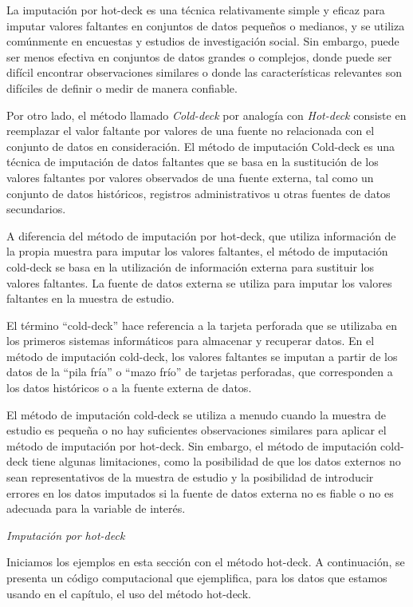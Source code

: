 \documentclass[
  12pt,
]{book}
\begin{document}
La imputación por hot-deck es una técnica relativamente simple y eficaz para imputar valores faltantes en conjuntos de datos pequeños o medianos, y se utiliza comúnmente en encuestas y estudios de investigación social. Sin embargo, puede ser menos efectiva en conjuntos de datos grandes o complejos, donde puede ser difícil encontrar observaciones similares o donde las características relevantes son difíciles de definir o medir de manera confiable.

Por otro lado, el método llamado \emph{Cold-deck} por analogía con \emph{Hot-deck} consiste en reemplazar el valor faltante por valores de una fuente no relacionada con el conjunto de datos en consideración. El método de imputación Cold-deck es una técnica de imputación de datos faltantes que se basa en la sustitución de los valores faltantes por valores observados de una fuente externa, tal como un conjunto de datos históricos, registros administrativos u otras fuentes de datos secundarios.

A diferencia del método de imputación por hot-deck, que utiliza información de la propia muestra para imputar los valores faltantes, el método de imputación cold-deck se basa en la utilización de información externa para sustituir los valores faltantes. La fuente de datos externa se utiliza para imputar los valores faltantes en la muestra de estudio.

El término ``cold-deck'' hace referencia a la tarjeta perforada que se utilizaba en los primeros sistemas informáticos para almacenar y recuperar datos. En el método de imputación cold-deck, los valores faltantes se imputan a partir de los datos de la ``pila fría'' o ``mazo frío'' de tarjetas perforadas, que corresponden a los datos históricos o a la fuente externa de datos.

El método de imputación cold-deck se utiliza a menudo cuando la muestra de estudio es pequeña o no hay suficientes observaciones similares para aplicar el método de imputación por hot-deck. Sin embargo, el método de imputación cold-deck tiene algunas limitaciones, como la posibilidad de que los datos externos no sean representativos de la muestra de estudio y la posibilidad de introducir errores en los datos imputados si la fuente de datos externa no es fiable o no es adecuada para la variable de interés.

\emph{Imputación por hot-deck}

Iniciamos los ejemplos en esta sección con el método hot-deck. A continuación, se presenta un código computacional que ejemplifica, para los datos que estamos usando en el capítulo, el uso del método hot-deck.
\end{document}
